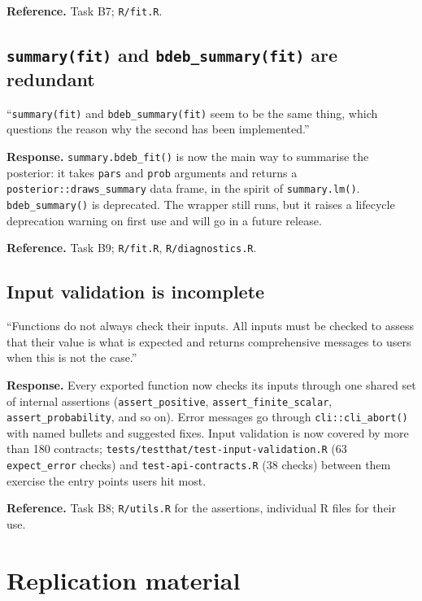 \documentclass[11pt,a4paper]{article}
\newcommand{\code}[1]{\texttt{#1}}
\newcommand{\pkg}[1]{\textsf{#1}}
\begin{document}
\textbf{Reference.} Task B7; \code{R/fit.R}.

\subsection{\code{summary(fit)} and \code{bdeb\_summary(fit)} are
redundant}

\begin{displayquote}
``\verb|summary(fit)| and \verb|bdeb_summary(fit)| seem to be
the same thing, which questions the reason why the second has been
implemented.''
\end{displayquote}

\textbf{Response.} \code{summary.bdeb\_fit()} is now the main way to
summarise the posterior: it takes \code{pars} and \code{prob} arguments
and returns a \code{posterior::draws\_summary} data frame, in the spirit
of \code{summary.lm()}. \code{bdeb\_summary()} is deprecated. The wrapper
still runs, but it raises a \pkg{lifecycle} deprecation warning on first
use and will go in a future release.

\textbf{Reference.} Task B9; \code{R/fit.R}, \code{R/diagnostics.R}.

\subsection{Input validation is incomplete}

\begin{displayquote}
``Functions do not always check their inputs. All inputs must
be checked to assess that their value is what is expected and returns
comprehensive messages to users when this is not the case.''
\end{displayquote}

\textbf{Response.} Every exported function now checks its inputs through
one shared set of internal assertions (\code{assert\_positive},
\code{assert\_finite\_scalar}, \code{assert\_probability}, and so on).
Error messages go through \code{cli::cli\_abort()} with named bullets and
suggested fixes. Input validation is now covered by more than 180
contracts; \code{tests/testthat/test-input-validation.R} (63
\code{expect\_error} checks) and \code{test-api-contracts.R} (38 checks)
between them exercise the entry points users hit most.

\textbf{Reference.} Task B8; \code{R/utils.R} for the assertions,
individual R files for their use.

\section{Replication material}
\end{document}
